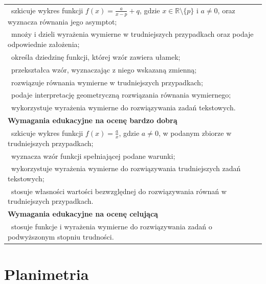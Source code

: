 \documentclass[12pt,a4paper]{article}
\begin{document}
\begin{longtable}{|p{16cm}|}
		\textbullet\ szkicuje wykres funkcji $f(x)=\frac{a}{x-p}+q$, gdzie $x\in\mathbb{R}\setminus\{p\}$ i $a\neq 0$, oraz wyznacza równania jego asymptot; \\
		
		\textbullet\ mnoży i dzieli wyrażenia wymierne w trudniejszych przypadkach oraz podaje odpowiednie założenia; \\
		
		\textbullet\ określa dziedzinę funkcji, której wzór zawiera ułamek; \\
		
		\textbullet\ przekształca wzór, wyznaczając z niego wskazaną zmienną; \\
		
		\textbullet\ rozwiązuje równania wymierne w trudniejszych przypadkach; \\
		
		\textbullet\ podaje interpretację geometryczną rozwiązania równania wymiernego; \\
		
		\textbullet\ wykorzystuje wyrażenia wymierne do rozwiązywania zadań tekstowych. \\ \hline
		
		\textbf{Wymagania edukacyjne na ocenę bardzo dobrą} \\ \hline
		
		\textbullet\ szkicuje wykres funkcji $f(x)=\frac{a}{x}$, gdzie $a\neq 0$, w podanym zbiorze w trudniejszych przypadkach; \\
		
		\textbullet\ wyznacza wzór funkcji spełniającej podane warunki; \\
		
		\textbullet\ wykorzystuje wyrażenia wymierne do rozwiązywania trudniejszych zadań tekstowych; \\
		
		\textbullet\ stosuje własności wartości bezwzględnej do rozwiązywania równań w trudniejszych przypadkach. \\ \hline
		
		\textbf{Wymagania edukacyjne na ocenę celującą} \\ \hline
		
		\textbullet\ stosuje funkcje i wyrażenia wymierne do rozwiązywania zadań o podwyższonym stopniu trudności. \\ \hline
		
	\end{longtable}
	
	\section{Planimetria}
	
\end{document}
